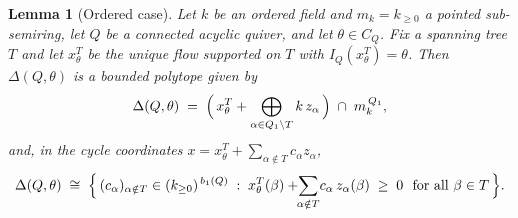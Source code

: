 \documentclass[12pt]{amsart}
\theoremstyle{plain}
\newtheorem{lemma}[theorem]{Lemma}
\theoremstyle{definition}
\begin{document}
\begin{lemma}[Ordered case]
Let $k$ be an ordered field and $m_k = k_{\geq 0}$ a pointed sub-semiring, let
$Q$ be a connected acyclic quiver, and let $\theta \in C_Q$. Fix a spanning tree
$T$ and let $x^T_\theta$ be the unique flow supported on $T$ with
$I_Q(x^T_\theta) = \theta$. Then 
$\Delta(Q,\theta)$ is a bounded polytope given by
\[
  \Delta(Q,\theta)
  \;=\; \Bigl(\, x^T_\theta + \bigoplus_{\alpha \in Q_1 \setminus T} k\, z_\alpha \,\Bigr)
        \;\cap\; m_k^{\,Q_1},
\]
and, in the cycle coordinates $x = x^T_\theta + \sum_{\alpha\notin T} c_\alpha z_\alpha$,
\[
  \Delta(Q,\theta) \;\cong\;
  \Bigl\{\, (c_\alpha)_{\alpha\notin T} \in (k_{\geq 0})^{\,b_1(Q)} \;:\;
     x^T_\theta(\beta) + \!\!\sum_{\alpha\notin T}\! c_\alpha\, z_\alpha(\beta) \;\ge\; 0
     \ \text{ for all } \beta \in T \,\Bigr\}.
\]
\end{lemma}
\end{document}
